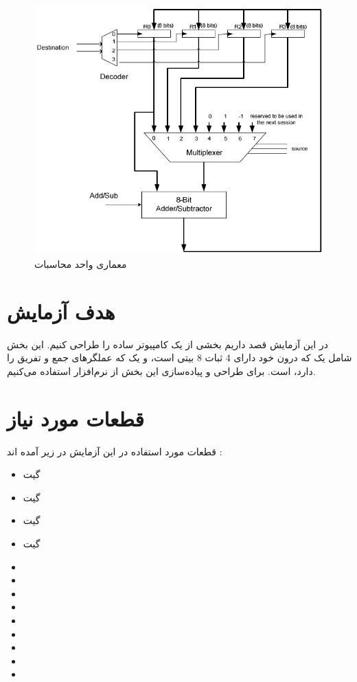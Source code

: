 \documentclass[fleqn]{article}
\begin{document}
\begin{figure}[!htbp]
  \includegraphics[width=\textwidth]{Assets/architecture.png}
  \caption{معماری واحد محاسبات}
  \label{arch}
\end{figure}

\section{هدف آزمایش}
در این آزمایش قصد داریم بخشی از یک کامپیوتر ساده را طراحی کنیم. این بخش شامل یک 
که درون خود دارای 4 ثبات 8 بیتی است، 
و یک 
که عملگرهای جمع و تفریق را دارد، است. برای طراحی و پیاده‌سازی این بخش از نرم‌افزار 
استفاده می‌کنیم. 

\section{قطعات مورد نیاز}
قطعات مورد استفاده در این آزمایش در زیر آمده اند : 

\begin{itemize}
  \item گیت 
  \item گیت 
  \item گیت 
  \item گیت 
  \item {}
  \item {}
  \item {}
  \item {}
  \item {}
  \item {}
  \item {}
  \item {}
  \item {}
\end{itemize}
\end{document}
